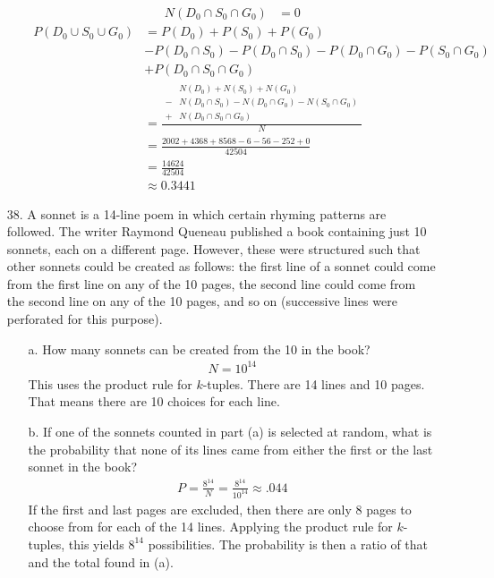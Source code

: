 \documentclass[letterpaper,12pt]{article}
\begin{document}
\begin{enumerate}
\begin{enumerate}
\begin{align*}
          N(D_0 \cap S_0 \cap G_0) &= 0
        \end{align*}
        \begin{align*}
          P(D_0 \cup S_0 \cup G_0) &= P(D_0) + P(S_0) + P(G_0) \\
          &- P(D_0 \cap S_0) - P(D_0 \cap S_0) - P(D_0 \cap G_0) - P(S_0 \cap G_0) \\
          &+ P(D_0 \cap S_0 \cap G_0) \\
          &= \frac{\begin{aligned}
            &N(D_0) + N(S_0) + N(G_0) \\
            - &N(D_0 \cap S_0) - N(D_0 \cap G_0) - N(S_0 \cap G_0) \\
            + &N(D_0 \cap S_0 \cap G_0)
          \end{aligned}}{N} \\
          &= \frac{2002 + 4368 + 8568 - 6 - 56 - 252 + 0}{42504} \\
          &= \frac{14624}{42504} \\
          &\approx 0.3441
        \end{align*}
    \end{enumerate}
  \item[38.]
    A sonnet is a 14-line poem in which certain rhyming patterns are followed. The writer Raymond Queneau published a book containing just 10 sonnets, each on a different page. However, these were structured such that other sonnets could be created as follows: the first line of a sonnet could come from the first line on any of the 10 pages, the second line could come from the second line on any of the 10 pages, and so on (successive lines were perforated for this purpose).
    \begin{enumerate}
        \item[a.]
          How many sonnets can be created from the 10 in the book?
          \begin{align*}
            N = 10^{14}
          \end{align*}
          This uses the product rule for $k$-tuples. There are 14 lines and 10 pages. That means there are 10 choices for each line.
        \item[b.]
          If one of the sonnets counted in part (a) is selected at random, what is the probability that none of its lines came from either the first or the last sonnet in the book?
          \begin{align*}
            P = \frac{8^{14}}{N} = \frac{8^{14}}{10^{14}} \approx .044
          \end{align*}
          If the first and last pages are excluded, then there are only 8 pages to choose from for each of the 14 lines. Applying the product rule for $k$-tuples, this yields $8^{14}$ possibilities. The probability is then a ratio of that and the total found in (a).
      \end{enumerate}
\end{enumerate}
\end{document}
